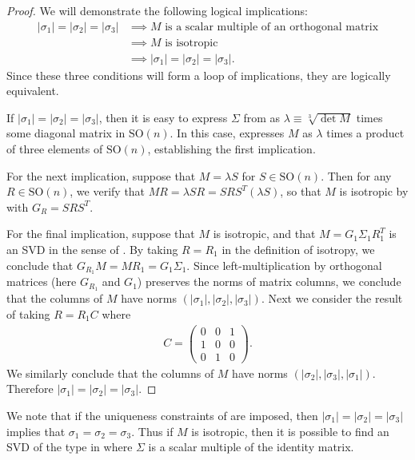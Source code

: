 \begin{proof}
We will demonstrate the following logical implications:
\begin{align*}
\left|\sigma_{1}\right|=\left|\sigma_{2}\right|=\left|\sigma_{3}\right| & \implies M\textrm{ is a scalar multiple of an orthogonal matrix}\\
 & \implies M\textrm{ is isotropic}\\
 & \implies\left|\sigma_{1}\right|=\left|\sigma_{2}\right|=\left|\sigma_{3}\right|.
\end{align*}
 Since these three conditions will form a loop of implications, they are logically equivalent. 

If $\left|\sigma_{1}\right|=\left|\sigma_{2}\right|=\left|\sigma_{3}\right|$, then it is easy to express $\Sigma$ from  as $\lambda\equiv\sqrt[3]{\det M}$ times some diagonal matrix in $\mathrm{SO}(n)$. In this case,  expresses $M$ as $\lambda$ times a product of three elements of $\mathrm{SO}(n)$, establishing the first implication. 

For the next implication, suppose that $M=\lambda S$ for $S\in\mathrm{SO}(n)$. Then for any $R\in\mathrm{SO}(n)$, we verify that $MR=\lambda SR=SRS^{T}(\lambda S)$, so that $M$ is isotropic by  with $G_{R}=SRS^{T}$. 

For the final implication, suppose that $M$ is isotropic, and that $M=G_{1}\Sigma_{1}R_{1}^{T}$ is an SVD in the sense of . By taking $R=R_{1}$ in the definition of isotropy, we conclude that $G_{R_{1}}M=MR_{1}=G_{1}\Sigma_{1}$. Since left-multiplication by orthogonal matrices (here $G_{R_{1}}$ and $G_{1}$) preserves the norms of matrix columns, we conclude that the columns of $M$ have norms $\left(\left|\sigma_{1}\right|,\left|\sigma_{2}\right|,\left|\sigma_{3}\right|\right)$. Next we consider the result of taking $R=R_{1}C$ where 
\begin{gather*}
C=\left(\begin{array}{ccc}
0 & 0 & 1\\
1 & 0 & 0\\
0 & 1 & 0
\end{array}\right).
\end{gather*}
 We similarly conclude that the columns of $M$ have norms $\left(\left|\sigma_{2}\right|,\left|\sigma_{3}\right|,\left|\sigma_{1}\right|\right)$. Therefore $\left|\sigma_{1}\right|=\left|\sigma_{2}\right|=\left|\sigma_{3}\right|$. 
\end{proof}
We note that if the uniqueness constraints of  are imposed, then $\left|\sigma_{1}\right|=\left|\sigma_{2}\right|=\left|\sigma_{3}\right|$ implies that $\sigma_{1}=\sigma_{2}=\sigma_{3}$. Thus if $M$ is isotropic, then it is possible to find an SVD of the type in  where $\Sigma$ is a scalar multiple of the identity matrix.

